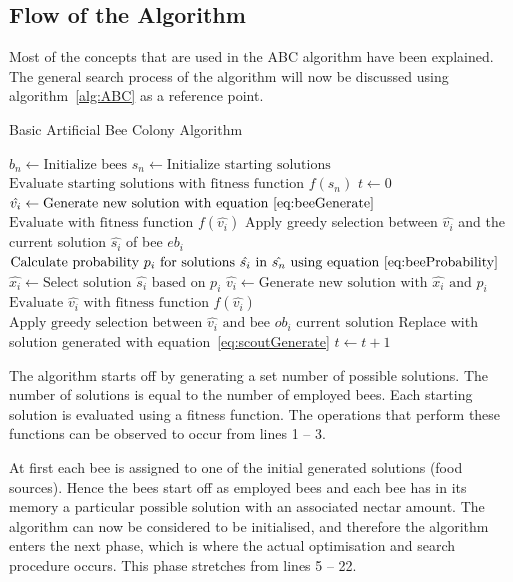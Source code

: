 \subsection{Flow of the Algorithm}
Most of the concepts that are used in the \gls{ABC} algorithm have been explained. The general search process of the algorithm will now be discussed using algorithm~\ref{alg:ABC} as a reference point.
\begin{algorithm}[H]
\caption{Basic Artificial Bee Colony Algorithm\cite{ABCCompareStudy}}
\label{alg:ABC}
	\begin{algorithmic}[1]
		\State$b_n \leftarrow \text{Initialize bees}$
		\State$s_n \leftarrow \text{Initialize starting solutions}$
		\State$\text{Evaluate starting solutions with fitness function $f(s_n)$}$
		\State$t \leftarrow 0$
				\State$\hat{v_i} \leftarrow \text{Generate new solution with equation~\ref{eq:beeGenerate}}$
				\State$\text{Evaluate with fitness function $f(\hat{v_i})$}$
				\State Apply greedy selection between $\hat{v_i}$ and the current solution $\hat{s_i}$ of bee $eb_i$
			\EndFor
    \State$\text{Calculate probability $p_i$ for solutions $\hat{s_i}$ in $\hat{s_n}$ using equation~\ref{eq:beeProbability}}$
				\State$\hat{x_i} \leftarrow \text{Select solution $\hat{s_i}$ based on $p_i$} $
				\State$\hat{v_i} \leftarrow \text{Generate new solution with $\hat{x_i}$ and $p_i$}$
				\State$\text{Evaluate $\hat{v_i}$ with fitness function $f(\hat{v_i})$}$
				\State$\text{Apply greedy selection between $\hat{v_i}$ and bee $ob_i$ current solution}$
			\EndFor
				\State Replace with solution generated with equation~\ref{eq:scoutGenerate}
			\EndIf
			\State$t \leftarrow t + 1$
		\EndWhile
	\end{algorithmic}
\end{algorithm}
The algorithm starts off by generating a set number of possible solutions. The number of solutions is equal to the number of employed bees. Each starting solution is evaluated using a fitness function. The operations that perform these functions can be observed to occur from lines 1 -- 3.

At first each bee is assigned to one of the initial generated solutions (food sources). Hence the bees start off as employed bees and each bee has in its memory a particular possible solution with an associated nectar amount. The algorithm can now be considered to be initialised, and therefore the algorithm enters the next phase, which is where the actual optimisation and search procedure occurs. This phase stretches from lines 5 -- 22.

